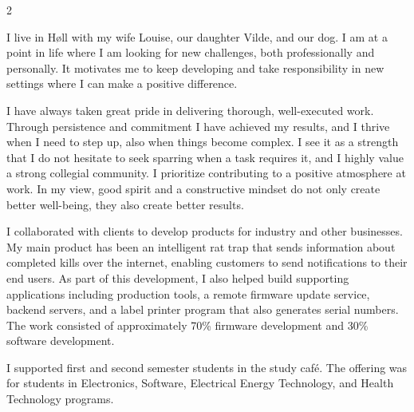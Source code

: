 \documentclass[10pt,a4paper,normalphoto]{altacv}
\begin{document}
\begin{paracol}{2}


I live in Høll with my wife Louise, our daughter Vilde, and our dog. I am at a point in life where I am looking for new challenges, both professionally and personally. It motivates me to keep developing and take responsibility in new settings where I can make a positive difference.

I have always taken great pride in delivering thorough, well-executed work. Through persistence and commitment I have achieved my results, and I thrive when I need to step up, also when things become complex. I see it as a strength that I do not hesitate to seek sparring when a task requires it, and I highly value a strong collegial community. I prioritize contributing to a positive atmosphere at work. In my view, good spirit and a constructive mindset do not only create better well-being, they also create better results.



I collaborated with clients to develop products for industry and other businesses. My main product has been an intelligent rat trap that sends information about completed kills over the internet, enabling customers to send notifications to their end users. As part of this development, I also helped build supporting applications including production tools, a remote firmware update service, backend servers, and a label printer program that also generates serial numbers. The work consisted of approximately 70\% firmware development and 30\% software development.


\divider


I supported first and second semester students in the study café. The offering was for students in Electronics, Software, Electrical Energy Technology, and Health Technology programs.


\end{paracol}
\end{document}
